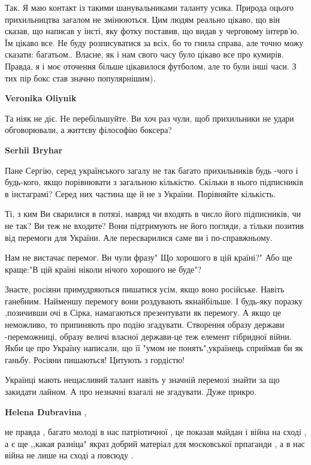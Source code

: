 \begin{itemize}
\begin{itemize}
Так. Я маю контакт із такими шанувальниками таланту усика. Природа оцього
прихильництва загалом не змінюються. Цим людям реально цікаво, що він сказав,
що написав у інсті, яку фотку поставив, що видав у черговому інтерв'ю. Їм
цікаво все. Не буду розписуватися за всіх, бо то гнила справа, але точно можу
сказати: багатьом.. Власне, як і нам свого часу було цікаво все про кумирів.
Правда, я і моє оточення більше цікавилося футболом, але то були інші часи. З
тих пір бокс став значно популярнішим).

\textbf{Veronika Oliynik} 

Та ніяк не діє. Не перебільшуйте. Ви хоч раз чули, щоб прихильники не удари
обговорювали, а життєву філософію боксера?

\textbf{Serhii Bryhar} 

Пане Сергію, серед українського загалу не так багато прихильників будь -чого і
будь-кого, якщо порівнювати з загальною кількістю. Скільки в нього підписників в
інстаграмі? Серед них частина ще й не з України. Порівняйте кількість.

Ті, з ким Ви сварилися в потязі, навряд чи входять в число його підписників, чи
не так? Ви теж не входите? Вони підтримують не його погляди, а тільки позитив
від перемоги для України. Але пересварилися саме ви і по-справжньому.

Нам не вистачає перемог. Ви чули фразу" Що хорошого в цій країні?" Або ще
краще:"В цій країні ніколи нічого хорошого не буде"?

Знаєте, росіяни примудряються пишатися усім, якщо воно російське. Навіть
ганебним. Найменшу перемогу вони роздувають якнайбільше. І будь-яку поразку
,позичивши очі в Сірка, намагаються презентувати як перемогу. А якщо це
неможливо, то припиняють про подію згадувати. Створення образу держави
-переможниці, образу величі власної держави-це теж елемент гібридної війни. Якби
це про Україну написали, що її "умом не понять",українець сприймав би як
ганьбу. Росіяни пишаються! Цитують з гордістю!

Українці мають нещасливий талант навіть у значній перемозі знайти за що
закидати лайном. А про незначні взагалі не згадувати. Дуже прикро.


\textbf{Helena Dubravina} , 

не правда , багато молоді в нас патріотичної , це показав майдан і війна на
сході , а є ще ,,какая разніца" якраз добрий матеріал для московської прпаганди
, а в нас війна не лише на сході а повсюду .



\end{itemize}
\end{itemize}
